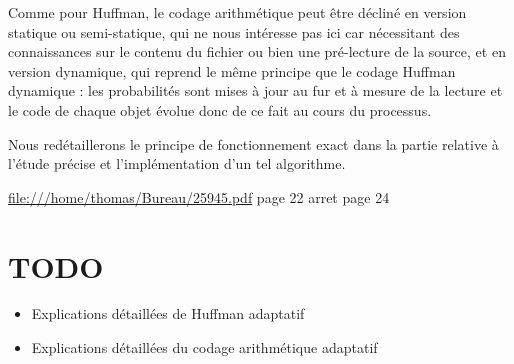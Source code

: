 \documentclass[a4paper, 11pt, twoside]{book}
\begin{document}
    Comme pour Huffman, le codage arithmétique peut être décliné en version statique ou semi-statique, qui ne nous intéresse pas ici car nécessitant des connaissances sur le contenu du fichier ou bien une pré-lecture de la source, et en version dynamique, qui reprend le même principe que le codage Huffman dynamique : les probabilités sont mises à jour au fur et à mesure de la lecture et le code de chaque objet évolue donc de ce fait au cours du processus.

    Nous redétaillerons le principe de fonctionnement exact dans la partie relative à l'étude précise et l'implémentation d'un tel algorithme.

    \url{file:///home/thomas/Bureau/25945.pdf} page 22
    arret page 24
    \section{TODO}

    \begin{itemize}
        \item Explications détaillées de Huffman adaptatif
        \item Explications détaillées du codage arithmétique adaptatif
    \end{itemize}
\end{document}
